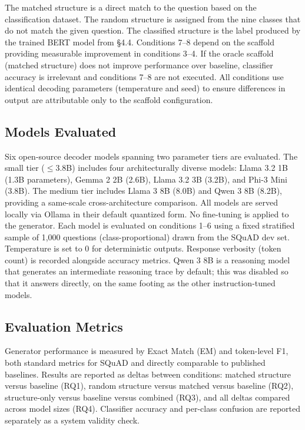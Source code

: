 \documentclass{article}
\begin{document}
The matched structure is a direct match to the question based on the classification dataset. The random structure is assigned from the nine classes that do not match the given question. The classified structure is the label produced by the trained BERT model from \S4.4. Conditions 7--8 depend on the scaffold providing measurable improvement in conditions 3--4. If the oracle scaffold (matched structure) does not improve performance over baseline, classifier accuracy is irrelevant and conditions 7--8 are not executed. All conditions use identical decoding parameters (temperature and seed) to ensure differences in output are attributable only to the scaffold configuration.

\subsection{Models Evaluated}

Six open-source decoder models spanning two parameter tiers are evaluated. The small tier ($\leq$3.8B) includes four architecturally diverse models: Llama 3.2 1B (1.3B parameters), Gemma 2 2B (2.6B), Llama 3.2 3B (3.2B), and Phi-3 Mini (3.8B). The medium tier includes Llama 3 8B (8.0B) and Qwen 3 8B (8.2B), providing a same-scale cross-architecture comparison. All models are served locally via Ollama in their default quantized form. No fine-tuning is applied to the generator. Each model is evaluated on conditions 1--6 using a fixed stratified sample of 1,000 questions (class-proportional) drawn from the SQuAD dev set. Temperature is set to 0 for deterministic outputs. Response verbosity (token count) is recorded alongside accuracy metrics. Qwen 3 8B is a reasoning model that generates an intermediate reasoning trace by default; this was disabled so that it answers directly, on the same footing as the other instruction-tuned models.

\subsection{Evaluation Metrics}

Generator performance is measured by Exact Match (EM) and token-level F1, both standard metrics for SQuAD and directly comparable to published baselines. Results are reported as deltas between conditions: matched structure versus baseline (RQ1), random structure versus matched versus baseline (RQ2), structure-only versus baseline versus combined (RQ3), and all deltas compared across model sizes (RQ4). Classifier accuracy and per-class confusion are reported separately as a system validity check.
\end{document}

